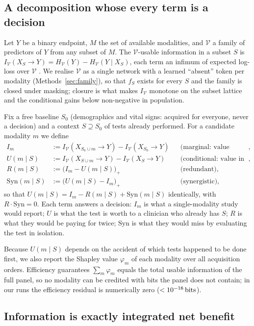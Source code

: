 \documentclass[11pt]{article}
\theoremstyle{definition}
\theoremstyle{remark}
\newcommand{\Vc}{\mathcal{V}}
\newcommand{\IV}{I_{\Vc}}
\newcommand{\HV}{H_{\Vc}}
\newcommand{\Xset}[1]{X_{#1}}
\newcommand{\bits}{\,\mathrm{bits}}
\begin{document}
\subsection{A decomposition whose every term is a decision}
\label{sec:decomp}

Let $Y$ be a binary endpoint, $M$ the set of available modalities, and $\Vc$ a
family of predictors of $Y$ from any subset of $M$. The $\Vc$-usable information
in a subset $S$ is $\IV(\Xset{S}\to Y) = \HV(Y) - \HV(Y\mid \Xset{S})$, each term
an infimum of expected log-loss over $\Vc$ \citep{xu2020vinfo}. We realise $\Vc$
as a single network with a learned ``absent'' token per modality
(Methods~\ref{sec:family}), so that $f_S$ exists for every $S$ and the family is
closed under masking; closure is what makes $\IV$ monotone on the subset lattice
and the conditional gains below non-negative in population.

Fix a free baseline $S_0$ (demographics and vital signs: acquired for everyone,
never a decision) and a context $S \supseteq S_0$ of tests already performed. For
a candidate modality $m$ we define
\begin{align}
I_m &:= \IV(\Xset{S_0\cup m}\to Y) - \IV(\Xset{S_0}\to Y)
  &&\text{(marginal: value alone)},\\
U(m\mid S) &:= \IV(\Xset{S\cup m}\to Y) - \IV(\Xset{S}\to Y)
  &&\text{(conditional: value in context)},\\
R(m\mid S) &:= \big(I_m - U(m\mid S)\big)_+ &&\text{(redundant)},\\
\mathrm{Syn}(m\mid S) &:= \big(U(m\mid S) - I_m\big)_+ &&\text{(synergistic)},
\end{align}
so that $U(m\mid S) = I_m - R(m\mid S) + \mathrm{Syn}(m\mid S)$ identically, with
$R\cdot\mathrm{Syn}=0$. Each term answers a decision: $I_m$ is what a
single-modality study would report; $U$ is what the test is worth to a clinician
who already has $S$; $R$ is what they would be paying for twice;
$\mathrm{Syn}$ is what they would miss by evaluating the test in isolation.

Because $U(m\mid S)$ depends on the accident of which tests happened to be done
first, we also report the Shapley value $\varphi_m$ of each modality over all
acquisition orders. Efficiency guarantees $\sum_m \varphi_m$ equals the total
usable information of the full panel, so no modality can be credited with bits
the panel does not contain; in our runs the efficiency residual is numerically
zero ($<\shapleyEffResidual\bits$).

\subsection{Information is exactly integrated net benefit}
\label{sec:res-identity}
\end{document}
